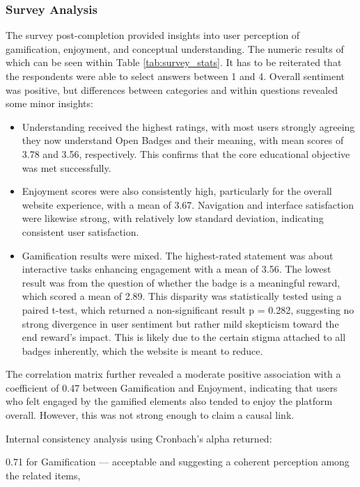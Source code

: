 \subsubsection{Survey Analysis}

The survey post-completion provided insights into user perception of gamification, enjoyment, and conceptual understanding. 
The numeric results of which can be seen within Table \ref{tab:survey_stats}. 
It has to be reiterated that the respondents were able to select answers between 1 and 4.
Overall sentiment was positive, but differences between categories and within questions revealed some minor insights:

\begin{itemize}
        \item Understanding received the highest ratings, with most users strongly agreeing they now understand Open Badges and their meaning, with mean scores of 3.78 and 3.56, respectively. 
        This confirms that the core educational objective was met successfully.
        \item Enjoyment scores were also consistently high, particularly for the overall website experience, with a mean of 3.67. 
        Navigation and interface satisfaction were likewise strong, with relatively low standard deviation, indicating consistent user satisfaction.
        \item Gamification results were mixed. The highest-rated statement was about interactive tasks enhancing engagement with a mean of 3.56. 
        The lowest result was from the question of whether the badge is a meaningful reward, which scored a mean of 2.89. 
        This disparity was statistically tested using a paired t-test, which returned a non-significant result p = 0.282, suggesting no strong divergence in user sentiment but rather mild skepticism toward the end reward's impact. 
        This is likely due to the certain stigma attached to all badges inherently, which the website is meant to reduce.
\end{itemize}

The correlation matrix further revealed a moderate positive association with a coefficient of 0.47 between Gamification and Enjoyment, indicating that users who felt engaged by the gamified elements also tended to enjoy the platform overall. However, this was not strong enough to claim a causal link.

Internal consistency analysis using Cronbach’s alpha returned:

0.71 for Gamification — acceptable and suggesting a coherent perception among the related items,

